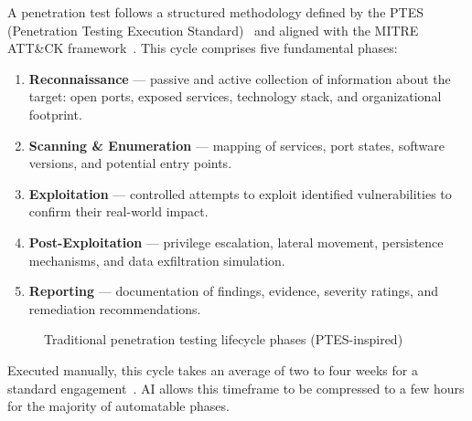 \documentclass[12pt,a4paper]{report}
\begin{document}
A penetration test follows a structured methodology defined by the PTES
(Penetration Testing Execution Standard)~\cite{ptes} and aligned with the MITRE ATT\&CK framework~\cite{mitreattack}. This cycle comprises five fundamental phases:
\begin{enumerate}
    \item \textbf{Reconnaissance} --- passive and active collection of information
    about the target: open ports, exposed services, technology stack, and
    organizational footprint.
    \item \textbf{Scanning \& Enumeration} --- mapping of services, port states,
    software versions, and potential entry points.
    \item \textbf{Exploitation} --- controlled attempts to exploit identified
    vulnerabilities to confirm their real-world impact.
    \item \textbf{Post-Exploitation} --- privilege escalation, lateral movement,
    persistence mechanisms, and data exfiltration simulation.
    \item \textbf{Reporting} --- documentation of findings, evidence, severity
    ratings, and remediation recommendations.
\end{enumerate}

\begin{figure}[H]
    \centering
    \caption{Traditional penetration testing lifecycle phases (PTES-inspired)}
    \label{fig:pentest_lifecycle}
\end{figure}


Executed manually, this cycle takes an average of two to four weeks for a standard
engagement~\cite{triaxiomTimeline,valuementorLifecycle}. AI allows this timeframe to
be compressed to a few hours for the majority of automatable phases.
\end{document}
